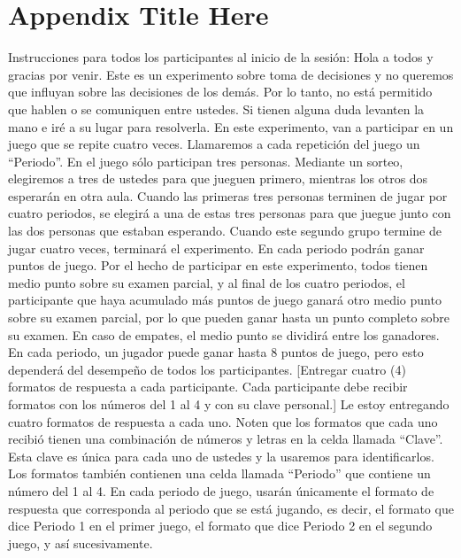 
\chapter{Appendix Title Here} %

\label{AppendixX} %

Instrucciones para todos los participantes al inicio de la sesión:
Hola a todos y gracias por venir. Este es un experimento sobre toma de decisiones y no queremos que influyan sobre las decisiones de los demás. Por lo tanto, no está permitido que hablen o se comuniquen entre ustedes.
Si tienen alguna duda levanten la mano e iré a su lugar para resolverla.
En este experimento, van a participar en un juego que se repite cuatro veces. Llamaremos a cada repetición del juego un “Periodo”. En el juego sólo participan tres personas. Mediante un sorteo, elegiremos a tres de ustedes para que jueguen primero, mientras los otros dos esperarán en otra aula. Cuando las primeras tres personas terminen de jugar por cuatro periodos, se elegirá a una de estas tres personas para que juegue junto con las dos personas que estaban esperando. Cuando este segundo grupo termine de jugar cuatro veces, terminará el experimento.
En cada periodo podrán ganar puntos de juego. Por el hecho de participar en este experimento, todos tienen medio punto sobre su examen parcial, y al final de los cuatro periodos, el participante que haya acumulado más puntos de juego ganará otro medio punto sobre su examen parcial, por lo que pueden ganar hasta un punto completo sobre su examen. En caso de empates, el medio punto se dividirá entre los ganadores. En cada periodo, un jugador puede ganar hasta 8 puntos de juego, pero esto dependerá del desempeño de todos los participantes.
[Entregar cuatro (4) formatos de respuesta a cada participante. Cada participante debe recibir formatos con los números del 1 al 4 y con su clave personal.]
Le estoy entregando cuatro formatos de respuesta a cada uno. Noten que los formatos que cada uno recibió tienen una combinación de números y letras en la celda llamada “Clave”. Esta clave es única para cada uno de ustedes y la usaremos para identificarlos.
Los formatos también contienen una celda llamada “Periodo” que contiene un número del 1 al 4. En cada periodo de juego, usarán únicamente el formato de respuesta que corresponda al periodo que se está jugando, es decir, el formato que dice Periodo 1 en el primer juego, el formato que dice Periodo 2 en el segundo juego, y así sucesivamente.
